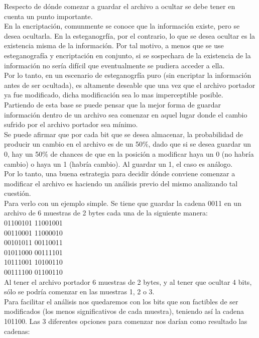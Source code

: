 \documentclass{article}
\begin{document}
\noindent Respecto de dónde comezar a guardar el archivo a ocultar se debe tener en cuenta un punto importante.\\
En la encriptación, comunmente se conoce que la información existe, pero se desea ocultarla. En la esteganogrfía, por el contrario, lo que se desea ocultar es la existencia misma de la información. Por tal motivo, a menos que se use esteganografía y encriptación en conjunto, si se sospechara de la existencia de la información no sería difícil que eventualmente se pudiera acceder a ella.\\
Por lo tanto, en un escenario de esteganogrfía puro (sin encriptar la información antes de ser ocultada), es altamente deseable que una vez que el archivo portador ya fue modificado, dicha modificación sea lo mas imperceptible posible.\\
Partiendo de esta base se puede pensar que la mejor forma de guardar información dentro de un archivo sea comenzar en aquel lugar donde el cambio sufrido por el archivo portador sea mínimo.\\
Se puede afirmar que por cada bit que se desea almacenar, la probabilidad de producir un cambio en el archivo es de un 50$\%$, dado que si se desea guardar un 0, hay un 50$\%$ de chances de que en la posición a modificar haya un 0 (no habría cambio) o haya un 1 (habría cambio). Al guardar un 1, el caso es análogo.\\
Por lo tanto, una buena estrategia para decidir dónde conviene comenzar a modificar el archivo es haciendo un análisis previo del mismo analizando tal cuestión.\\
Para verlo con un ejemplo simple. Se tiene que guardar la cadena 0011 en un archivo de 6 muestras de 2 bytes cada una de la siguiente manera: \\
01100101 11001001 \\
00110001 11000010 \\
00101011 00110011 \\
01011000 00111101 \\
10111001 10100110 \\
00111100 01100110 \\
Al tener el archivo portador 6 muestras de 2 bytes, y al tener que ocultar 4 bits, sólo se podría comenzar en las muestras 1, 2 o 3.\\
Para facilitar el análisis nos quedaremos con los bits que son factibles de ser modificados (los menos significativos de cada muestra), teniendo así la cadena 101100. Las 3 diferentes opciones para comenzar nos darían como resultado las cadenas: \\
\end{document}
